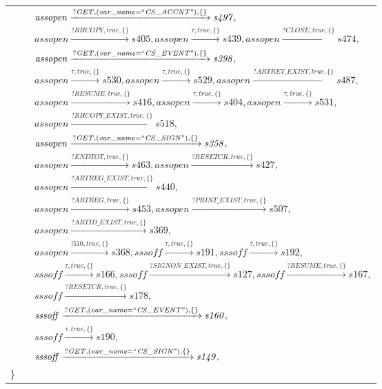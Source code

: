 \begin{tabular}{lcl}
& & $\mathit{assopen}\xrightarrow{\mathit{?GET}, \mathit{(var\_name = ``CS\_ACCNT")}, \{\}}\mathit{s497},$ \\
& & $\mathit{assopen}\xrightarrow{\mathit{?RHCOPY}, \mathit{true}, \{\}}\mathit{s405},\mathit{assopen}\xrightarrow{\mathit{\tau}, \mathit{true}, \{\}}\mathit{s439},\mathit{assopen}\xrightarrow{\mathit{?CLOSE}, \mathit{true}, \{\}}\mathit{s474},$ \\
& & $\mathit{assopen}\xrightarrow{\mathit{?GET}, \mathit{(var\_name = ``CS\_EVENT")}, \{\}}\mathit{s398},$ \\
& & $\mathit{assopen}\xrightarrow{\mathit{\tau}, \mathit{true}, \{\}}\mathit{s530},\mathit{assopen}\xrightarrow{\mathit{\tau}, \mathit{true}, \{\}}\mathit{s529},\mathit{assopen}\xrightarrow{\mathit{?ARTRET\_EXIST}, \mathit{true}, \{\}}\mathit{s487},$ \\
& & $\mathit{assopen}\xrightarrow{\mathit{?RESUME}, \mathit{true}, \{\}}\mathit{s416},\mathit{assopen}\xrightarrow{\mathit{\tau}, \mathit{true}, \{\}}\mathit{s404},\mathit{assopen}\xrightarrow{\mathit{\tau}, \mathit{true}, \{\}}\mathit{s531},$ \\
& & $\mathit{assopen}\xrightarrow{\mathit{?RHCOPY\_EXIST}, \mathit{true}, \{\}}\mathit{s518},$ \\
& & $\mathit{assopen}\xrightarrow{\mathit{?GET}, \mathit{(var\_name = ``CS\_SIGN")}, \{\}}\mathit{s358},$ \\
& & $\mathit{assopen}\xrightarrow{\mathit{?ENDTOT}, \mathit{true}, \{\}}\mathit{s463},\mathit{assopen}\xrightarrow{\mathit{?RESETCR}, \mathit{true}, \{\}}\mathit{s427},$ \\
& & $\mathit{assopen}\xrightarrow{\mathit{?ARTREG\_EXIST}, \mathit{true}, \{\}}\mathit{s440},$ \\
& & $\mathit{assopen}\xrightarrow{\mathit{?ARTREG}, \mathit{true}, \{\}}\mathit{s453},\mathit{assopen}\xrightarrow{\mathit{?PRINT\_EXIST}, \mathit{true}, \{\}}\mathit{s507},$ \\
& & $\mathit{assopen}\xrightarrow{\mathit{?ARTID\_EXIST}, \mathit{true}, \{\}}\mathit{s369},$ \\
& & $\mathit{assopen}\xrightarrow{\mathit{!510}, \mathit{true}, \{\}}\mathit{s368},\mathit{sssoff}\xrightarrow{\mathit{\tau}, \mathit{true}, \{\}}\mathit{s191},\mathit{sssoff}\xrightarrow{\mathit{\tau}, \mathit{true}, \{\}}\mathit{s192},$ \\
& & $\mathit{sssoff}\xrightarrow{\mathit{\tau}, \mathit{true}, \{\}}\mathit{s166}, \mathit{sssoff}\xrightarrow{\mathit{?SIGNON\_EXIST}, \mathit{true}, \{\}}\mathit{s127},\mathit{sssoff}\xrightarrow{\mathit{?RESUME}, \mathit{true}, \{\}}\mathit{s167},$ \\
& & $\mathit{sssoff}\xrightarrow{\mathit{?RESETCR}, \mathit{true}, \{\}}\mathit{s178},$ \\
& & $\mathit{sssoff}\xrightarrow{\mathit{?GET}, \mathit{(var\_name = ``CS\_EVENT")}, \{\}}\mathit{s160},$ \\
& & $\mathit{sssoff}\xrightarrow{\mathit{\tau}, \mathit{true}, \{\}}\mathit{s190},$ \\
& & $\mathit{sssoff}\xrightarrow{\mathit{?GET}, \mathit{(var\_name = ``CS\_SIGN")}, \{\}}\mathit{s149},$ \\
\}
\end{tabular}

